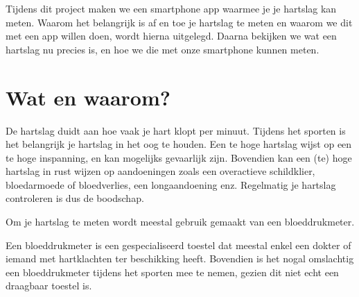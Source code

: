 \label{sec:inl}

\begin{samenvatting}
Tijdens dit project maken we een smartphone app waarmee je je hartslag kan meten. Waarom het belangrijk is af en toe je hartslag te meten en waarom we dit met een app willen doen, wordt hierna uitgelegd. Daarna bekijken we wat een hartslag nu precies is, en hoe we die met onze smartphone kunnen meten.
\end{samenvatting}
%

\section{Wat en waarom?}
\label{sec:Mod1_Sec1}
%
De hartslag duidt aan hoe vaak je hart klopt per minuut. Tijdens het sporten is het belangrijk je hartslag in het oog te houden. Een te hoge hartslag wijst op een te hoge inspanning, en kan mogelijks gevaarlijk zijn. Bovendien kan een (te) hoge hartslag in rust wijzen op aandoeningen zoals een overactieve schildklier, bloedarmoede of bloedverlies, een longaandoening enz. Regelmatig je hartslag controleren is dus de boodschap.

Om je hartslag te meten wordt meestal gebruik gemaakt van een bloeddrukmeter.

\begin{minipage}{.5\linewidth}
\end{minipage} 
\begin{minipage}{.5\linewidth}
\end{minipage} 

Een bloeddrukmeter is een gespecialiseerd toestel dat meestal enkel een dokter of iemand met hartklachten ter beschikking heeft. Bovendien is het nogal omslachtig een bloeddrukmeter tijdens het sporten mee te nemen, gezien dit niet echt een draagbaar toestel is.


